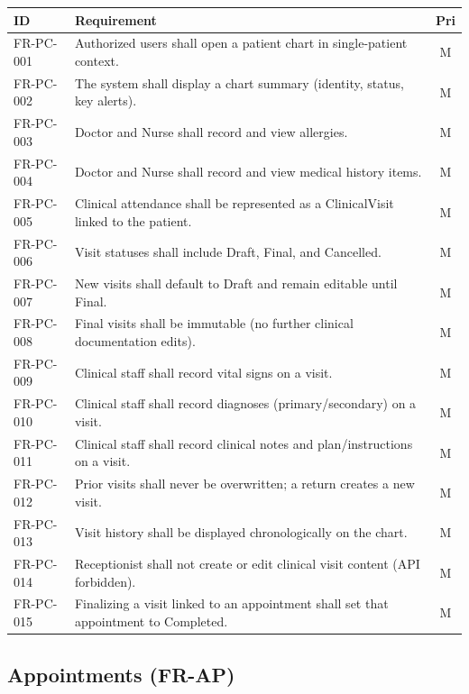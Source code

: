 \documentclass[11pt,a4paper]{article}
\begin{document}
\begin{longtable}{@{}p{2.2cm}p{11.2cm}c@{}}
\toprule
\textbf{ID} & \textbf{Requirement} & \textbf{Pri} \\
\midrule
\endhead
FR-PC-001 & Authorized users shall open a patient chart in single-patient context. & M \\
FR-PC-002 & The system shall display a chart summary (identity, status, key alerts). & M \\
FR-PC-003 & Doctor and Nurse shall record and view allergies. & M \\
FR-PC-004 & Doctor and Nurse shall record and view medical history items. & M \\
FR-PC-005 & Clinical attendance shall be represented as a ClinicalVisit linked to the patient. & M \\
FR-PC-006 & Visit statuses shall include Draft, Final, and Cancelled. & M \\
FR-PC-007 & New visits shall default to Draft and remain editable until Final. & M \\
FR-PC-008 & Final visits shall be immutable (no further clinical documentation edits). & M \\
FR-PC-009 & Clinical staff shall record vital signs on a visit. & M \\
FR-PC-010 & Clinical staff shall record diagnoses (primary/secondary) on a visit. & M \\
FR-PC-011 & Clinical staff shall record clinical notes and plan/instructions on a visit. & M \\
FR-PC-012 & Prior visits shall never be overwritten; a return creates a new visit. & M \\
FR-PC-013 & Visit history shall be displayed chronologically on the chart. & M \\
FR-PC-014 & Receptionist shall not create or edit clinical visit content (API forbidden). & M \\
FR-PC-015 & Finalizing a visit linked to an appointment shall set that appointment to Completed. & M \\
\bottomrule
\end{longtable}

\subsection{Appointments (FR-AP)}
\end{document}
